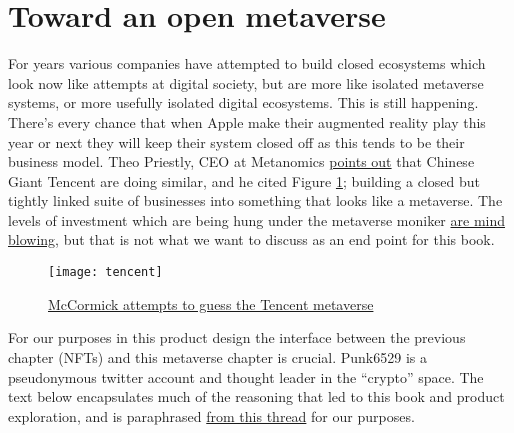 \section{Toward an open metaverse}
For years various companies have attempted to build closed ecosystems which look now like attempts at digital society, but are more like isolated metaverse systems, or more usefully isolated digital ecosystems. This is still happening. There's every chance that when Apple make their augmented reality play this year or next they will keep their system closed off as this tends to be their business model. Theo Priestly, CEO at Metanomics \href{https://www.linkedin.com/feed/update/urn:li:activity:6977366421034967040/}{points out} that Chinese Giant Tencent are doing similar, and he cited Figure \ref{fig:tencent}; building a closed but tightly linked suite of businesses into something that looks like a metaverse. The levels of investment which are being hung under the metaverse moniker \href{https://www.scmp.com/tech/policy/article/3194092/chinas-iphone-production-hub-henan-bets-its-future-metaverse}{are mind blowing}, but that is not what we want to discuss as an end point for this book.
\begin{figure}
  \centering
    \texttt{[image: tencent]}
  \caption{\href{https://www.notboring.co/p/tencents-dreams}{McCormick attempts to guess the Tencent metaverse}}
  \label{fig:tencent}
\end{figure}
For our purposes in this product design the interface between the previous chapter (NFTs) and this metaverse chapter is crucial. Punk6529 is a pseudonymous twitter account and thought leader in the ``crypto'' space. The text below encapsulates much of the reasoning that led to this book and product exploration, and is paraphrased \href{https://twitter.com/punk6529/status/1536046831045685248}{from this thread} for our purposes.\par
